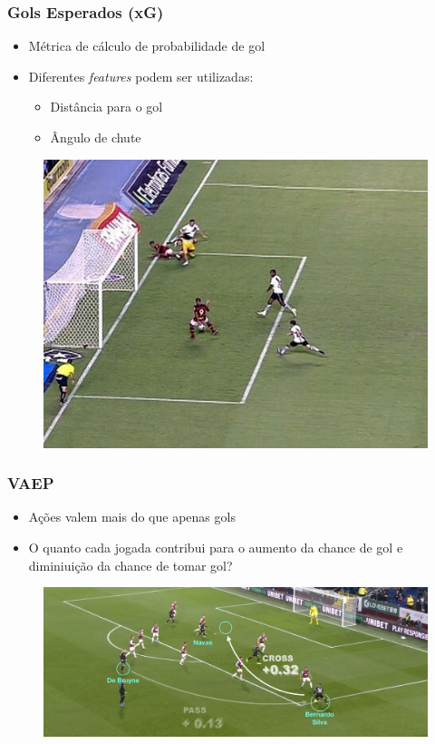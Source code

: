\documentclass{beamer}
\begin{document}
\begin{frame}
\frametitle{Gols Esperados (xG)}
\begin{itemize}
    \item Métrica de cálculo de probabilidade de gol
    \item Diferentes \textit{features} podem ser utilizadas:
    \begin{itemize}
        \item Distância para o gol
        \item Ângulo de chute
    \end{itemize}
\end{itemize}
\begin{figure}[H]
\centering
\includegraphics[width=\linewidth]{deivid.jpg}
\end{figure}
\end{frame}

\begin{frame}
\frametitle{VAEP}
\begin{itemize}
    \item Ações valem mais do que apenas gols
    \item O quanto cada jogada contribui para o aumento da chance de gol e diminiuição da chance de tomar gol?
\end{itemize}
\begin{figure}[H]
\centering
\includegraphics[width=\linewidth]{vaep.png}
\end{figure}
\end{frame}
\end{document}
